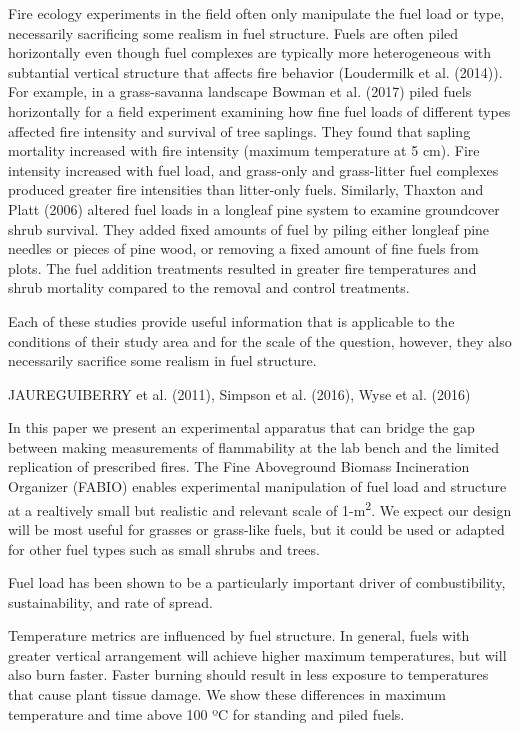 \documentclass[11pt,a4paper]{article}
\begin{document}
Fire ecology experiments in the field often only manipulate the fuel
load or type, necessarily sacrificing some realism in fuel structure.
Fuels are often piled horizontally even though fuel complexes are
typically more heterogeneous with subtantial vertical structure that
affects fire behavior (Loudermilk et al. (2014)). For example, in a
grass-savanna landscape Bowman et al. (2017) piled fuels horizontally
for a field experiment examining how fine fuel loads of different types
affected fire intensity and survival of tree saplings. They found that
sapling mortality increased with fire intensity (maximum temperature at
5 cm). Fire intensity increased with fuel load, and grass-only and
grass-litter fuel complexes produced greater fire intensities than
litter-only fuels. Similarly, Thaxton and Platt (2006) altered fuel
loads in a longleaf pine system to examine groundcover shrub survival.
They added fixed amounts of fuel by piling either longleaf pine needles
or pieces of pine wood, or removing a fixed amount of fine fuels from
plots. The fuel addition treatments resulted in greater fire
temperatures and shrub mortality compared to the removal and control
treatments.

Each of these studies provide useful information that is applicable to
the conditions of their study area and for the scale of the question,
however, they also necessarily sacrifice some realism in fuel structure.

JAUREGUIBERRY et al. (2011), Simpson et al. (2016), Wyse et al. (2016)

In this paper we present an experimental apparatus that can bridge the
gap between making measurements of flammability at the lab bench and the
limited replication of prescribed fires. The Fine Aboveground Biomass
Incineration Organizer (FABIO) enables experimental manipulation of fuel
load and structure at a realtively small but realistic and relevant
scale of 1-m\textsuperscript{2}. We expect our design will be most
useful for grasses or grass-like fuels, but it could be used or adapted
for other fuel types such as small shrubs and trees.

Fuel load has been shown to be a particularly important driver of
combustibility, sustainability, and rate of spread.

Temperature metrics are influenced by fuel structure. In general, fuels
with greater vertical arrangement will achieve higher maximum
temperatures, but will also burn faster. Faster burning should result in
less exposure to temperatures that cause plant tissue damage. We show
these differences in maximum temperature and time above 100 ºC for
standing and piled fuels.
\end{document}
